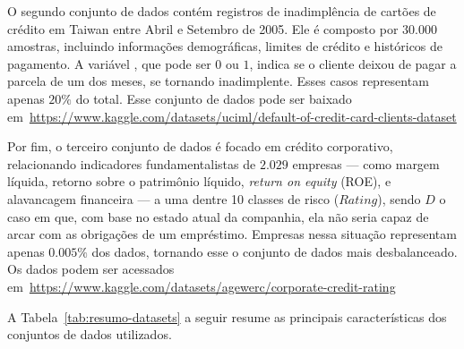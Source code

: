 O segundo conjunto de dados contém registros de inadimplência de cartões de crédito em Taiwan entre Abril e Setembro de 2005. Ele é composto por \(30.000\) amostras, incluindo informações demográficas, limites de crédito e históricos de pagamento. A variável , que pode ser \(0\) ou \(1\), indica se o cliente deixou de pagar a parcela de um dos meses, se tornando inadimplente. Esses casos representam apenas \(20\%\) do total. Esse conjunto de dados pode ser baixado em~\url{https://www.kaggle.com/datasets/uciml/default-of-credit-card-clients-dataset}

Por fim, o terceiro conjunto de dados é focado em crédito corporativo, relacionando indicadores fundamentalistas de \(2.029\) empresas — como margem líquida, retorno sobre o patrimônio líquido, \textit{return on equity} (ROE), e alavancagem financeira — a uma dentre 10 classes de risco (\(Rating\)), sendo \(D\) o caso em que, com base no estado atual da companhia, ela não seria capaz de arcar com as obrigações de um empréstimo. Empresas nessa situação representam apenas \(0.005\%\) dos dados, tornando esse o conjunto de dados mais desbalanceado. Os dados podem ser acessados em~\url{https://www.kaggle.com/datasets/agewerc/corporate-credit-rating}

A Tabela~\ref{tab:resumo-datasets} a seguir resume as principais características dos conjuntos de dados utilizados.

\begin{table}[h]
  \centering
  \caption{Características dos conjuntos de dados}
  \label{tab:resumo-datasets}
\end{table}

